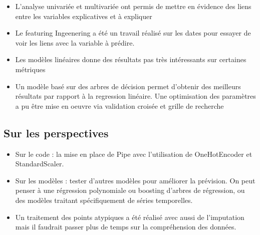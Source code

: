 \documentclass[11pt]{article}
\providecommand{\tightlist}{%
      \setlength{\itemsep}{0pt}\setlength{\parskip}{0pt}}
\begin{document}
\begin{itemize}
\tightlist
\item
  L'analyse univariée et multivariée ont permis de mettre en évidence
  des liens entre les variables explicatives et à expliquer
\item
  Le featuring Ingeenering a été un travail réalisé sur les dates pour
  essayer de voir les liens avec la variable à prédire.
\item
  Les modèles linéaires donne des résultats pas très intéressants sur
  certaines métriques
\item
  Un modèle basé sur des arbres de décision permet d'obtenir des
  meilleurs résultats par rapport à la regression linéaire. Une
  optimisation des paramètres a pu être mise en oeuvre via validation
  croisée et grille de recherche
\end{itemize}

\hypertarget{sur-les-perspectives}{%
\subsection{Sur les perspectives}\label{sur-les-perspectives}}

\begin{itemize}
\tightlist
\item
  Sur le code : la mise en place de Pipe avec l'utilisation de
  OneHotEncoder et StandardScaler.
\item
  Sur les modèles : tester d'autres modèles pour améliorer la prévision.
  On peut penser à une régression polynomiale ou boosting d'arbres de
  régression, ou des modèles traitant spécifiquement de séries
  temporelles.
\item
  Un traitement des points atypiques a été réalisé avec aussi de
  l'imputation mais il faudrait passer plus de temps sur la
  compréhension des données.
\end{itemize}


    
    
    
\end{document}
